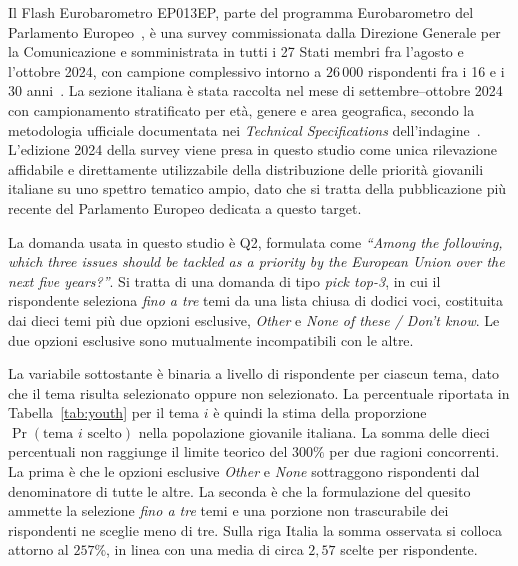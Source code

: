 \documentclass[11pt, a4paper]{article}
\begin{document}
Il Flash Eurobarometro EP013EP, parte del programma Eurobarometro del
Parlamento Europeo~\cite{eurobarometer_program}, \`e una survey
commissionata dalla Direzione Generale per la Comunicazione e
somministrata in tutti i 27 Stati membri fra l'agosto e l'ottobre 2024,
con campione complessivo intorno a $26\,000$ rispondenti fra i 16 e i 30
anni~\cite{ep2024youth}. La sezione italiana \`e stata raccolta nel mese
di settembre--ottobre 2024 con campionamento stratificato per et\`a,
genere e area geografica, secondo la metodologia ufficiale documentata
nei \textit{Technical Specifications}
dell'indagine~\cite{ep2024youth_methodology}. L'edizione 2024 della
survey viene presa in questo studio come unica rilevazione affidabile e
direttamente utilizzabile della distribuzione delle priorit\`a giovanili
italiane su uno spettro tematico ampio, dato che si tratta della
pubblicazione pi\`u recente del Parlamento Europeo dedicata a questo
target.

La domanda usata in questo studio \`e Q2, formulata come
\textit{``Among the following, which three issues should be tackled as a
priority by the European Union over the next five years?''}. Si tratta
di una domanda di tipo \textit{pick top-3}, in cui il rispondente
seleziona \emph{fino a tre} temi da una lista chiusa di dodici voci,
costituita dai dieci temi pi\`u due opzioni esclusive, \textit{Other} e
\textit{None of these / Don't know}. Le due opzioni esclusive sono
mutualmente incompatibili con le altre.

La variabile sottostante \`e binaria a livello di rispondente per
ciascun tema, dato che il tema risulta selezionato oppure non
selezionato. La percentuale riportata in Tabella~\ref{tab:youth} per il
tema $i$ \`e quindi la stima della proporzione $\Pr(\text{tema } i
\text{ scelto})$ nella popolazione giovanile italiana. La somma delle
dieci percentuali non raggiunge il limite teorico del $300\%$ per due
ragioni concorrenti. La prima \`e che le opzioni esclusive
\textit{Other} e \textit{None} sottraggono rispondenti dal denominatore
di tutte le altre. La seconda \`e che la formulazione del quesito
ammette la selezione \emph{fino a tre} temi e una porzione non
trascurabile dei rispondenti ne sceglie meno di tre. Sulla riga Italia
la somma osservata si colloca attorno al $257\%$, in linea con una media
di circa $2{,}57$ scelte per rispondente.
\end{document}
